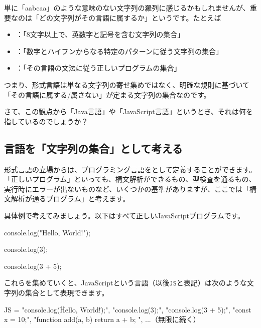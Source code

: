 単に「aabcaa」のような意味のない文字列の羅列に感じるかもしれませんが、重要なのは「どの文字列がその言語に属するか」というです。たとえば

\begin{itemize}
\item
  ：「8文字以上で、英数字と記号を含む文字列の集合」
\item
  ：「数字とハイフンからなる特定のパターンに従う文字列の集合」
\item
  ：「その言語の文法に従う正しいプログラムの集合」
\end{itemize}

つまり、形式言語は単なる文字列の寄せ集めではなく、明確な規則に基づいて「その言語に属する/属さない」が定まる文字列の集合なのです。

さて、この観点から「Java言語」や「JavaScript言語」というとき、それは何を指しているのでしょうか？

\subsection{言語を「文字列の集合」として考える}

形式言語の立場からは、プログラミング言語をとして定義することができます。「正しいプログラム」といっても、構文解析ができるもの、型検査を通るもの、実行時にエラーが出ないものなど、いくつかの基準がありますが、ここでは「構文解析が通るプログラム」と考えます。

具体例で考えてみましょう。以下はすべて正しいJavaScriptプログラムです。

\begin{codescreen}{}
console.log("Hello, World!");
\end{codescreen}

\begin{codescreen}{}
console.log(3);
\end{codescreen}

\begin{codescreen}{}
console.log(3 + 5);
\end{codescreen}

これらを集めていくと、JavaScriptという言語（以後\texttt{JS}と表記）は次のような文字列の集合として表現できます。

\begin{codescreen}{}
JS = {
  "console.log(\"Hello, World!\");",
  "console.log(3);",
  "console.log(3 + 5);",
  "const x = 10;",
  "function add(a, b) { return a + b; }",
  ...（無限に続く）
}
\end{codescreen}

